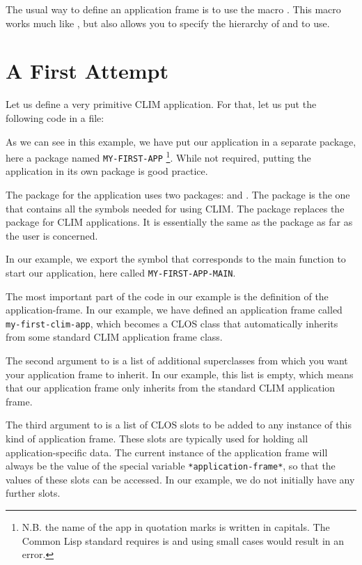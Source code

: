 The usual way to define an application frame is to use the macro
.  This macro works much like
, but also allows you to specify the hierarchy of
 and  to use.

\section{A First Attempt}

Let us define a very primitive CLIM application.  For that, let us put
the following code in a file:



As we can see in this example, we have put our application in a
separate package, here a package named
\texttt{MY-FIRST-APP} \footnote{N.B. the name of the app in quotation
  marks is written in capitals. The Common Lisp standard requires is
  and using small cases would result in an error.}. While not
required, putting the application in its own package is good practice.

The package for the application uses two packages:  and
.  The  package is the one that
contains all the symbols needed for using CLIM.  The
 package replaces the  package
for CLIM applications.  It is essentially the same as the
 package as far as the user is concerned.

In our example, we export the symbol that corresponds to the main
function to start our application, here called
\texttt{MY-FIRST-APP-MAIN}.

The most important part of the code in our example is the definition
of the application-frame.  In our example, we have defined an
application frame called \texttt{my-first-clim-app}, which becomes a
CLOS class that automatically inherits from some standard CLIM
application frame class.

The second argument to  is a list of
additional superclasses from which you want your application frame to
inherit.  In our example, this list is empty, which means that our
application frame only inherits from the standard CLIM application
frame.

The third argument to  is a list of
CLOS slots to be added to any instance of this kind of application
frame.  These slots are typically used for holding all
application-specific data.  The current instance of the application
frame will always be the value of the special variable
\texttt{*application-frame*}, so that the values of these slots can be
accessed.  In our example, we do not initially have any further slots.

